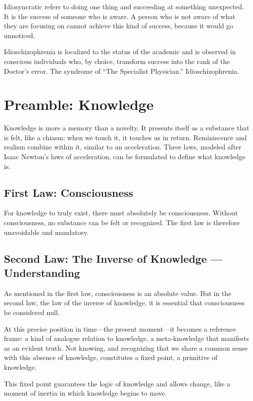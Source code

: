 \documentclass[12pt,oneside]{article}
\begin{document}
Idiosyncratic refers to doing one thing and succeeding at something unexpected. It is the success of someone who is aware. A person who is not aware of what they are focusing on cannot achieve this kind of success, because it would go unnoticed.

Idioschizophrenia is localized to the status of the academic and is observed in conscious individuals who, by choice, transform success into the rank of the Doctor’s error. The syndrome of “The Specialist Physician.” Idioschizophrenia.

\section{Preamble: Knowledge}

Knowledge is more a memory than a novelty. It presents itself as a substance that is felt, like a chiasm: when we touch it, it touches us in return. Reminiscence and realism combine within it, similar to an acceleration. Three laws, modeled after Isaac Newton’s laws of acceleration, can be formulated to define what knowledge is.

\subsection{First Law: Consciousness}

For knowledge to truly exist, there must absolutely be consciousness. Without consciousness, no substance can be felt or recognized. The first law is therefore unavoidable and mandatory.

\subsection{Second Law: The Inverse of Knowledge — Understanding}

As mentioned in the first law, consciousness is an absolute value. But in the second law, the law of the inverse of knowledge, it is essential that consciousness be considered null.

At this precise position in time—the present moment—it becomes a reference frame: a kind of analogue relation to knowledge, a meta‑knowledge that manifests as an evident truth. Not knowing, and recognizing that we share a common sense with this absence of knowledge, constitutes a fixed point, a primitive of knowledge.

This fixed point guarantees the logic of knowledge and allows change, like a moment of inertia in which knowledge begins to move.
\end{document}
